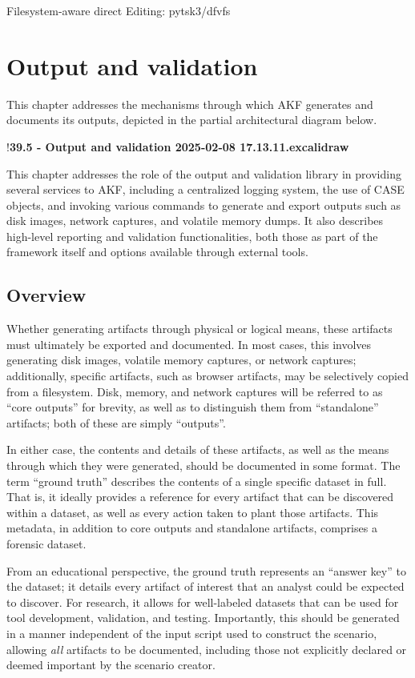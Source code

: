 \documentclass[letterpaper,12pt]{report}
\begin{document}
Filesystem-aware direct Editing: pytsk3/dfvfs

\chapter{Output and validation}\label{chapter-five}

This chapter addresses the mechanisms through which AKF generates and
documents its outputs, depicted in the partial architectural diagram
below.

!\textbf{39.5 - Output and validation 2025-02-08 17.13.11.excalidraw}

This chapter addresses the role of the output and validation library in
providing several services to AKF, including a centralized logging
system, the use of CASE objects, and invoking various commands to
generate and export outputs such as disk images, network captures, and
volatile memory dumps. It also describes high-level reporting and
validation functionalities, both those as part of the framework itself
and options available through external tools.

\section{Overview}\label{overview}

Whether generating artifacts through physical or logical means, these
artifacts must ultimately be exported and documented. In most cases,
this involves generating disk images, volatile memory captures, or
network captures; additionally, specific artifacts, such as browser
artifacts, may be selectively copied from a filesystem. Disk, memory,
and network captures will be referred to as ``core outputs'' for
brevity, as well as to distinguish them from ``standalone'' artifacts;
both of these are simply ``outputs''.

In either case, the contents and details of these artifacts, as well as
the means through which they were generated, should be documented in
some format. The term ``ground truth'' describes the contents of a
single specific dataset in full. That is, it ideally provides a
reference for every artifact that can be discovered within a dataset, as
well as every action taken to plant those artifacts. This metadata, in
addition to core outputs and standalone artifacts, comprises a forensic
dataset.

From an educational perspective, the ground truth represents an ``answer
key'' to the dataset; it details every artifact of interest that an
analyst could be expected to discover. For research, it allows for
well-labeled datasets that can be used for tool development, validation,
and testing. Importantly, this should be generated in a manner
independent of the input script used to construct the scenario, allowing
\emph{all} artifacts to be documented, including those not explicitly
declared or deemed important by the scenario creator.
\end{document}
